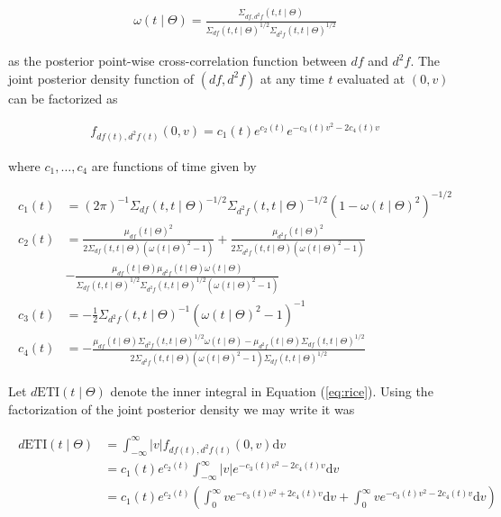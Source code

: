 \documentclass[11pt,]{article}
\theoremstyle{nonumberplain}
\begin{document}
\begin{align*}
  \omega(t \mid \Theta) = \frac{\Sigma_{df, d^2\!f}(t,t \mid \Theta)}{\Sigma_{df}(t,t \mid \Theta)^{1/2}\Sigma_{d^2\!f}(t,t \mid \Theta)^{1/2}}
\end{align*}

as the posterior point-wise cross-correlation function between \(df\)
and \(d^2\!f\). The joint posterior density function of \((df, d^2\!f)\)
at any time \(t\) evaluated at \((0, v)\) can be factorized as

\begin{align*}
f_{df(t), d^2\!f(t)}(0, v) = c_1(t) e^{c_2(t)} e^{-c_3(t) v^2 - 2c_4(t) v}
\end{align*}

where \(c_1, \ldots, c_4\) are functions of time given by

\begin{align*}
 c_1(t) &= (2\pi)^{-1} \Sigma_{df}(t,t \mid \Theta)^{-1/2}\Sigma_{d^2\!f}(t,t \mid \Theta)^{-1/2} (1-\omega(t \mid \Theta)^2)^{-1/2}\\
 c_2(t) &= \frac{\mu_{df}(t \mid \Theta)^2}{2\Sigma_{df}(t,t \mid \Theta)(\omega(t \mid \Theta)^2 - 1)} + \frac{\mu_{d^2\!f}(t \mid \Theta)^2}{2\Sigma_{d^2\!f}(t,t \mid \Theta)(\omega(t \mid \Theta)^2 - 1)}\\
        &- \frac{\mu_{df}(t \mid \Theta)\mu_{d^2\!f}(t \mid \Theta)\omega(t \mid \Theta)}{\Sigma_{df}(t,t \mid \Theta)^{1/2}\Sigma_{d^2\!f}(t,t \mid \Theta)^{1/2}(\omega(t \mid \Theta)^2 - 1)}\\
 c_3(t) &= -\frac{1}{2}\Sigma_{d^2\!f}(t,t \mid \Theta)^{-1}(\omega(t \mid \Theta)^2-1)^{-1}\\
 c_4(t) &= -\frac{\mu_{df}(t \mid \Theta) \Sigma_{d^2\!f}(t,t \mid \Theta)^{1/2} \omega(t \mid \Theta) - \mu_{d^2\!f}(t \mid \Theta) \Sigma_{df}(t,t \mid \Theta)^{1/2}}{2\Sigma_{d^2\!f}(t,t \mid \Theta)(\omega(t \mid \Theta)^2-1)\Sigma_{df}(t,t \mid \Theta)^{1/2}}
\end{align*}

Let \(d\mathrm{ETI}(t \mid \Theta)\) denote the inner integral in
Equation (\ref{eq:rice}). Using the factorization of the joint posterior
density we may write it was

\begin{align}
\begin{split}
d\mathrm{ETI}(t \mid \Theta) &= \int_{-\infty}^\infty |v| f_{df(t), d^2\!f(t)}(0, v)\mathrm{d}v\\
 &= c_1(t) e^{c_2(t)}\int_{-\infty}^\infty |v| e^{-c_3(t) v^2 - 2c_4(t) v}\mathrm{d}v\\
 &= c_1(t) e^{c_2(t)}\left(\int_0^\infty v e^{-c_3(t) v^2 + 2c_4(t) v}\mathrm{d}v + \int_0^\infty v e^{-c_3(t) v^2 - 2c_4(t) v}\mathrm{d}v\right)
\end{split}
\label{dETIintegral1}
\end{align}
\end{document}
